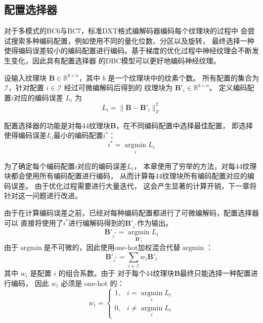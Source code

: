 \subsection{配置选择器}

对于多模式的BC6与BC7，标准DXT格式编解码器编码每个纹理块的过程中
会尝试搜索多种编码配置，例如使用不同的量化位数、分区以及旋转，
最终选择一种使得编码误差较小的编码配置进行编码。基于梯度的优化过程中神经纹理会不断发生变化，因此具有配置选择器
的DBC模型可以更好地编码神经纹理。

设输入纹理块 $\mathbf{B}\in\mathbb{R}^{b\times n}$，其中 $b$ 是一个纹理块中的纹素个数。
所有配置的集合为 $\mathcal{I}$，针对配置 $i\in\mathcal{I}$ 经过可微编解码后得到的
纹理块为 $\mathbf{B}'_i\in\mathbb{R}^{b\times n}$。
定义编码配置$i$对应的编码误差 $L_i$ 为
\begin{equation}
L_i=\|\mathbf{B}-\mathbf{B}'_i\|_F^2
\end{equation}

配置选择器的功能是对每4\times4纹理块$\mathbf{B}$，在不同编码配置中选择最佳配置，
即选择使得编码误差$L_i$最小的编码配置$i^*$：
\begin{equation}
    i^*=\mathop{\arg\min}\limits_{i} L_i
\end{equation}

为了确定每个编码配置$i$对应的编码误差$L_i$，
本章使用了穷举的方法，对每4\times4纹理块都会使用所有编码配置进行编码，
从而计算每4\times4纹理块所有编码配置对应的编码误差。
由于优化过程需要进行大量迭代，
这会产生显著的计算开销，下一章将针对这一问题进行改进。

由于在计算编码误差之前，已经对每种编码配置都进行了可微编解码，配置选择器可以
直接将使用了$i^*$进行编解码得到的$\mathbf{B}'_{i^*}$作为输出。
\begin{equation}
    \mathbf{B}'_{i^*}=\mathop{\arg\min}\limits_{\mathbf{B}'_i} L_i
\end{equation}
由于$\mathop{\arg\min}$是不可微的，因此使用one-hot加权混合代替$\mathop{\arg\min}$：
\begin{equation}
\mathbf{B}'_{i^*}=\sum_{i\in\mathcal{I}} w_i\mathbf{B}'_i
\end{equation}
其中 $w_i$ 是配置 $i$ 的组合系数。由于
对于每个4\times4纹理块$\mathbf{B}$最终只能选择一种配置进行编码，
因此 $w_i$ 必须是 one-hot 的：
\begin{equation}
    w_i =\left\{\begin{matrix}
        1,& i=\mathop{\arg\min}\limits_{i} L_i
        \\0,& i\ne\mathop{\arg\min}\limits_{i} L_i
        \end{matrix}\right.
\end{equation}

